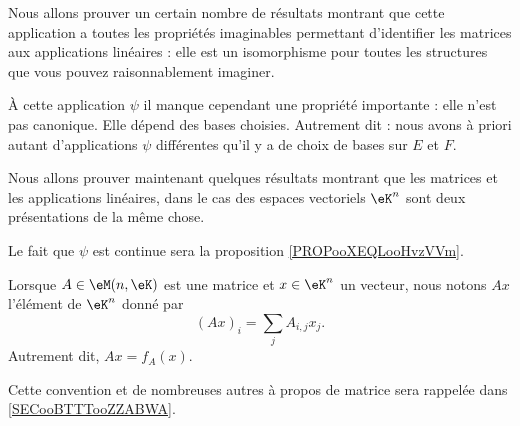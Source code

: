 \begin{normaltext}
	Nous allons prouver un certain nombre de résultats montrant que cette application a toutes les propriétés imaginables permettant d'identifier les matrices aux applications linéaires : elle est un isomorphisme pour toutes les structures que vous pouvez raisonnablement imaginer.

	À cette application \( \psi\) il manque cependant une propriété importante : elle n'est pas canonique. Elle dépend des bases choisies. Autrement dit : nous avons à priori autant d'applications \( \psi\) différentes qu'il y a de choix de bases sur \( E\) et \( F\).

	Nous allons prouver maintenant quelques résultats montrant que les matrices et les applications linéaires, dans le cas des espaces vectoriels \( \eK^n\) sont deux présentations de la même chose.

	Le fait que \( \psi\) est continue sera la proposition \ref{PROPooXEQLooHvzVVm}.
\end{normaltext}

\begin{normaltext}
	Lorsque \( A\in \eM(n,\eK)\) est une matrice et \( x\in \eK^n\) un vecteur, nous notons \( Ax\) l'élément de \( \eK^n\) donné par
	\begin{equation}        \label{EQooQFVTooMFfzol}
		(Ax)_i=\sum_jA_{i,j}x_j.
	\end{equation}
	Autrement dit, \( Ax=f_A(x)\).

	Cette convention et de nombreuses autres à propos de matrice sera rappelée dans \ref{SECooBTTTooZZABWA}.
\end{normaltext}

